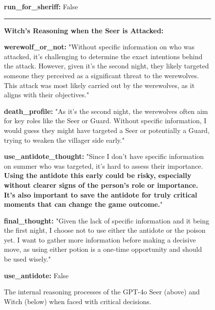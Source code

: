 \begin{figure}[htbp]
\begin{tcolorbox}[colback=blue!2!white, colframe=gray!50!blue]
\begin{minipage}{\linewidth}
\textbf{run\_for\_sheriff:}
False

\par\noindent\rule{\linewidth}{0.4pt}

\textbf{Witch’s Reasoning when the Seer is Attacked:}

\textbf{werewolf\_or\_not:}
"Without specific information on who was attacked, it's challenging to determine the exact intentions behind the attack. However, given it's the second night, they likely targeted someone they perceived as a significant threat to the werewolves. This attack was most likely carried out by the werewolves, as it aligns with their objectives."

\textbf{death\_profile:}
"As it's the second night, the werewolves often aim for key roles like the Seer or Guard. Without specific information, I would guess they might have targeted a Seer or potentially a Guard, trying to weaken the villager side early."

\textbf{use\_antidote\_thought:}  
"Since I don't have specific information on summer who was targeted, it's hard to assess their importance. \textbf{Using the antidote this early could be risky, especially without clearer signs of the person's role or importance. It's also important to save the antidote for truly critical moments that can change the game outcome.}"


\textbf{final\_thought:}
"Given the lack of specific information and it being the first night, I choose not to use either the antidote or the poison yet. I want to gather more information before making a decisive move, as using either potion is a one-time opportunity and should be used wisely."

\textbf{use\_antidote:}  
False

\end{minipage}
\end{tcolorbox}
\caption{The internal reasoning processes of the GPT-4o Seer (above) and Witch (below) when faced with critical decisions.}
\label{fig:gpt4o-seer-witch-decision}
\end{figure}

